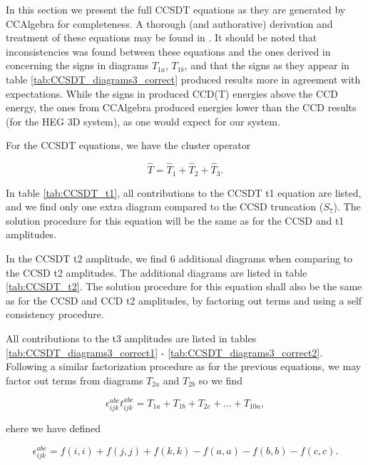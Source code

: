 In this section we present the full CCSDT equations as they are generated by CCAlgebra for completeness. A thorough (and authorative) derivation and treatment of these equations may be found in \cite{ShavittBartlett2009}. It should be noted that inconsistencies was found between these equations and the ones derived in \cite{ShavittBartlett2009} concerning the signs in diagrams $T_{1a}$, $T_{1b}$, and that the signs as they appear in table \ref{tab:CCSDT_diagrams3_correct} produced results more in agreement with expectations. While the signs in \cite{ShavittBartlett2009} produced CCD(T) energies above the CCD energy, the ones from CCAlgebra produced energies lower than the CCD results (for the HEG 3D system), as one would expect for our system.

For the CCSDT equations, we have the cluster operator

\begin{equation}
\hat{T} = \hat{T}_1 + \hat{T}_2 + \hat{T}_3.
\end{equation}

In table \ref{tab:CCSDT_t1}, all contributions to the CCSDT t1 equation are listed, and we find only one extra diagram compared to the CCSD truncation ($S_7$). The solution procedure for this equation will be the same as for the CCSD and t1 amplitudes.

In the CCSDT t2 amplitude, we find 6 additional diagrams when comparing to the CCSD t2 amplitudes. The additional diagrams are listed in table \ref{tab:CCSDT_t2}. The solution procedure for this equation shall also be the same as for the CCSD and CCD t2 amplitudes, by factoring out terms and using a self consistency procedure.

All contributions to the t3 amplitudes are listed in tables \ref{tab:CCSDT_diagrams3_correct1} - \ref{tab:CCSDT_diagrams3_correct2}. Following a similar factorization procedure as for the previous equations, we may factor out terms from diagrams $T_{2a}$ and $T_{2b}$ so we find 

\begin{equation}
\epsilon^{abc}_{ijk} t^{abc}_{ijk} = T_{1a} + T_{1b} + T_{2c} + ... + T_{10a},
\label{eqn:t3_factor}
\end{equation}

ehere we have defined

\begin{equation}
\epsilon^{abc}_{ijk} = f(i,i) + f(j,j) + f(k,k) - f(a,a) - f(b,b) - f(c,c).
\label{eqn:t3_factor}
\end{equation}

